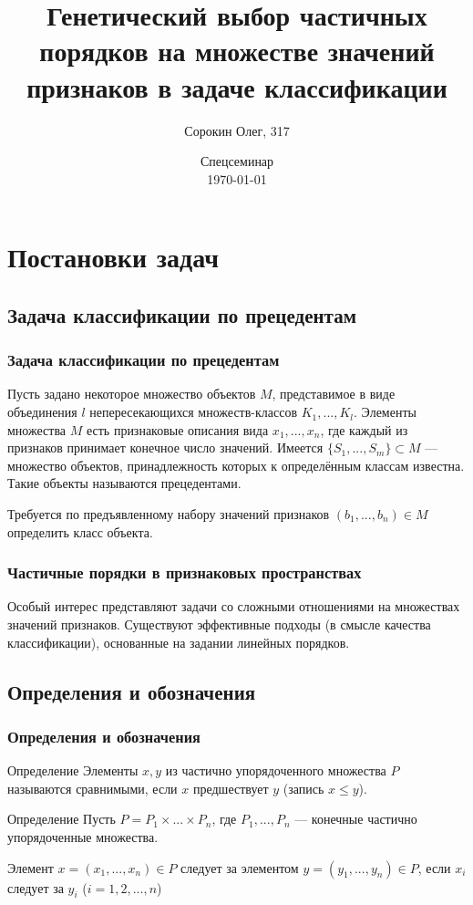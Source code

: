 \documentclass[
	11pt,
]{beamer}
\title[Генетический подход к выбору частичных порядков]{Генетический выбор частичных порядков на множестве значений признаков в задаче классификации}
\author[Сорокин Олег, 317 группа ММП ВМК МГУ]{Сорокин Олег, 317}
\institute[ММП ВМК МГУ]{ММП ВМК МГУ}
\date[\today]{Спецсеминар \\ \today}
\begin{document}
\begin{frame}
	\titlepage
\end{frame}

\begin{frame}
	\tableofcontents
\end{frame}

\section{Постановки задач}

\subsection{Задача классификации по прецедентам}

\begin{frame}
	\frametitle{Задача классификации по прецедентам}
	
	Пусть задано некоторое множество объектов $M$, представимое в виде объединения $l$ непересекающихся множеств-классов $K_1, ..., K_l$. Элементы множества $M$ есть признаковые описания вида $x_1, ..., x_n$, где каждый из признаков принимает конечное число значений. Имеется $\{S_1, ..., S_m\} \subset M$ — множество объектов, принадлежность которых к определённым классам известна. Такие объекты называются прецедентами.
	
	\bigskip

	Требуется по предъявленному набору значений признаков $(b_1, ..., b_n) \in M$ определить класс объекта.

\end{frame}

\begin{frame}
	\frametitle{Частичные порядки в признаковых пространствах}
	
	Особый интерес представляют задачи со сложными отношениями на множествах значений признаков. Существуют эффективные подходы (в смысле качества классификации), основанные на задании линейных порядков.

\end{frame}

\subsection{Определения и обозначения}

\begin{frame}
	\frametitle{Определения и обозначения}
	
	\begin{block}{Определение}
		Элементы $x, y$ из частично упорядоченного множества $P$ называются сравнимыми, если $x$ предшествует $y$ (запись $x \leq y$).
	\end{block}

	\begin{block}{Определение}
		Пусть $P = P_1 \times ... \times P_n$, где $P_1, ..., P_n$ — конечные частично упорядоченные множества.

		Элемент $x = (x_1, ..., x_n) \in P$ следует за элементом $y = (y_1, ..., y_n) \in P$, если $x_i$ следует за $y_i$ ($i = 1, 2, ..., n$)
	\end{block}

\end{frame}
\end{document}
